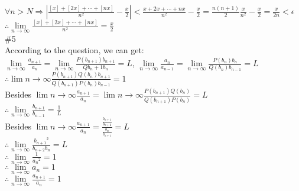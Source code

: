 \documentclass{article}
\begin{document}
$\forall n>N\Rightarrow\left|\frac{[x]+[2x]+\cdots +[nx]}{n^2}-\frac{x}{2}\right|<\frac{x+2x+\cdots+nx}{n^2}-\frac{x}{2}=\frac{n(n+1)}{2}\frac{x}{n^2}-\frac{x}{2}=\frac{x}{2n}<\epsilon$\\

$\therefore$\qquad$\lim \limits_{n \to \infty}\frac{[x]+[2x]+\cdots +[nx]}{n^2}=\frac{x}{2}$\\

\textcolor[rgb]{0.00,0.00,0.50}{\#5}\\

According to the question, we can get:\\

$\lim \limits_{n \to \infty}\frac{a_{n+1}}{a_n}=\lim \limits_{n \to \infty}\frac{P(b_{n+1})b_{n+1}}{Q{b_n+1}b_n}=L$, $\lim \limits_{n \to \infty}\frac{a_n}{a_{n-1}}=\lim \limits_{n \to \infty}\frac{P(b_n)b_n}{Q(b_n)b_{n-1}}=L$\\
 
$\therefore$\qquad$\lim \limits{n \to \infty}\frac{P(b_{n+1})Q(b_n)b_{n+1}}{Q(b_{n+1})P(b_n)b_{n-1}}=1$\\

Besides $\lim \limits{n \to \infty}\frac{a_{n+1}}{a_n}=\lim \limits{n \to \infty}\frac{P(b_{n+1})Q(b_n)}{Q(b_{n+1})P(b_n)}=L$\\

$\therefore$\qquad$\lim \limits_{n \to \infty}\frac{b_{n+1}}{b_{n-1}}=\frac{1}{L}$\\

Besides $\lim \limits{n \to \infty}\frac{a_{n+1}}{a_n}=\frac{\frac{b_{n+1}}{b_{n+2}}}{\frac{b_n}{b_{n+1}}}=L$\\

$\therefore$\qquad$\lim \limits_{n \to \infty}\frac{{b_{n+1}}^2}{b_{n+2}b_n}=L$\\

$\therefore$\qquad$\lim \limits_{n \to \infty}\frac{1}{{a_n}^2}=1$\\

$\therefore$\qquad$\lim \limits_{n \to \infty}a_n=1$\\

$\therefore$\qquad$\lim \limits_{n \to \infty}\frac{a_{n+1}}{a_n}=1$\\
\end{document}
